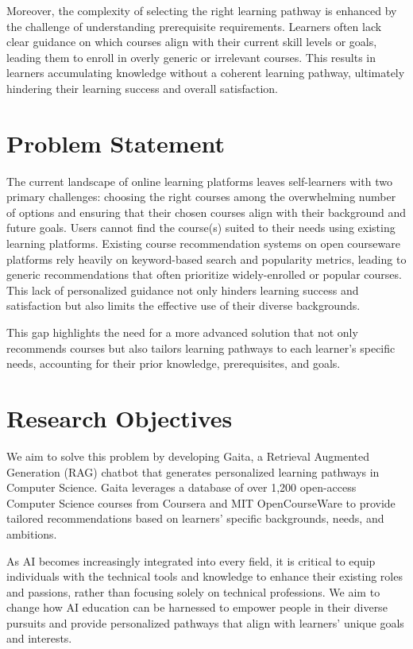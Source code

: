 Moreover, the complexity of selecting the right learning pathway is enhanced by the challenge of understanding prerequisite requirements. Learners often lack clear guidance on which courses align with their current skill levels or goals, leading them to enroll in overly generic or irrelevant courses. This results in learners accumulating knowledge without a coherent learning pathway, ultimately hindering their learning success and overall satisfaction.


\section{Problem Statement}

The current landscape of online learning platforms leaves self-learners with two primary challenges: choosing the right courses among the overwhelming number of options and ensuring that their chosen courses align with their background and future goals.  Users cannot find the course(s) suited to their needs using existing learning platforms. Existing course recommendation systems on open courseware platforms rely heavily on keyword-based search and popularity metrics, leading to generic recommendations that often prioritize widely-enrolled or popular courses. This lack of personalized guidance not only hinders learning success and satisfaction but also limits the effective use of their diverse backgrounds.

This gap highlights the need for a more advanced solution that not only recommends courses but also tailors learning pathways to each learner’s specific needs, accounting for their prior knowledge, prerequisites, and goals.

\section{Research Objectives}

We aim to solve this problem by developing Gaita, a Retrieval Augmented Generation (RAG) chatbot that generates personalized learning pathways in Computer Science. Gaita leverages a database of over 1,200 open-access Computer Science courses from Coursera and MIT OpenCourseWare to provide tailored recommendations based on learners’ specific backgrounds, needs, and ambitions. 

As AI becomes increasingly integrated into every field, it is critical to equip individuals with the technical tools and knowledge to enhance their existing roles and passions, rather than focusing solely on technical professions. We aim to change how AI education can be harnessed to empower people in their diverse pursuits and provide personalized pathways that align with learners’ unique goals and interests.